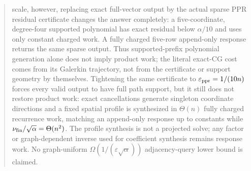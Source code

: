 \documentclass[11pt]{article}
\begin{document}
\begin{abstract}
scale, however, replacing exact full-vector output by the actual sparse PPR
residual certificate changes the answer completely: a five-coordinate,
degree-four supported polynomial has exact residual below
$\alpha/10$ and uses only constant charged work.  A fully charged five-row
append-only response returns the same sparse output.  Thus supported-prefix
polynomial generation alone does not imply product work; the literal exact-CG
cost comes from its Galerkin trajectory, not from the certificate or support
geometry by themselves.  Tightening the same certificate to
$\epsppr=1/(10n)$ forces every valid output to have full path support, but it
still does not restore product work: exact cancellations generate singleton
coordinate directions and a fixed spatial profile is synthesized in
$\Theta(n)$ fully charged recurrence work, matching an append-only response
up to constants while $\nu_{\rm fin}/\sqrt\alpha=\Theta(n^2)$.  The profile
synthesis is not a projected solve; any factor or graph-dependent inverse
used for coefficient synthesis remains response work.  No graph-uniform
$\Omega(1/(\varepsilon\sqrt\alpha))$ adjacency-query lower bound is claimed.
\end{abstract}

\tableofcontents






























\end{document}
